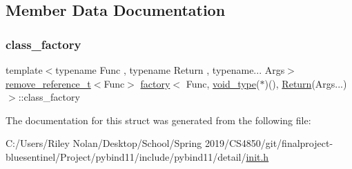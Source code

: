 \subsection{Member Data Documentation}
\mbox{\label{structfactory_3_01_func_00_01void__type_07_5_08_07_08_00_01_return_07_args_8_8_8_08_4_a0189b962378d0f232a6d7495fe687e97}} 
\subsubsection{\texorpdfstring{class\_factory}{class\_factory}}
{\footnotesize\ttfamily template$<$typename Func , typename Return , typename... Args$>$ \\
\mbox{\hyperlink{detail_2common_8h_a3a08cea569e6926ac8d7d74dd7178b5f}{remove\+\_\+reference\+\_\+t}}$<$Func$>$ \mbox{\hyperlink{structfactory}{factory}}$<$ Func, \mbox{\hyperlink{structvoid__type}{void\+\_\+type}}($\ast$)(), \mbox{\hyperlink{_python-ast_8h_abdae7f49d66ce8e500825bb53aa14901}{Return}}(Args...)$>$\+::class\+\_\+factory}



The documentation for this struct was generated from the following file\+:\begin{DoxyCompactItemize}
\item 
C\+:/\+Users/\+Riley Nolan/\+Desktop/\+School/\+Spring 2019/\+C\+S4850/git/finalproject-\/bluesentinel/\+Project/pybind11/include/pybind11/detail/\mbox{\hyperlink{init_8h}{init.\+h}}\end{DoxyCompactItemize}
